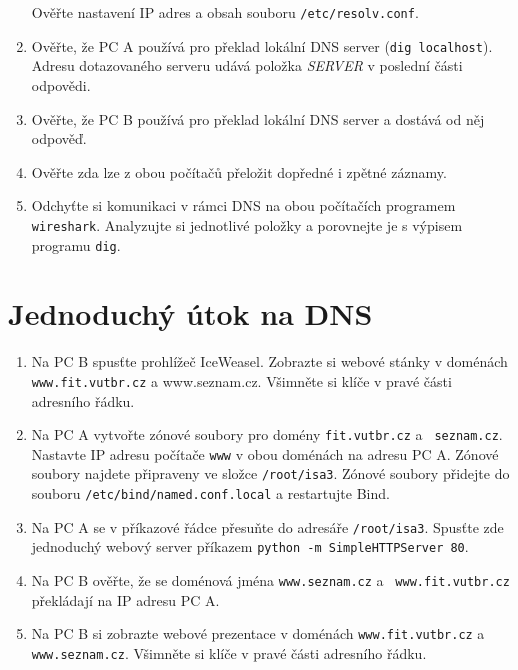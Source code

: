 \begin{enumerate}
    Ověřte nastavení IP adres a obsah souboru {\tt /etc/resolv.conf}.
  \item Ověřte, že PC A používá pro překlad lokální DNS server ({\tt dig
    localhost}). Adresu dotazovaného serveru udává položka {\em SERVER} v
    poslední části odpovědi.
  \item Ověřte, že PC B používá pro překlad lokální DNS server a dostává od něj odpověď.
  \item Ověřte zda lze z obou počítačů přeložit dopředné i zpětné záznamy.
  \item Odchyťte si komunikaci v rámci DNS na obou počítačích programem
    {\tt wireshark}. Analyzujte si jednotlivé položky a porovnejte je s výpisem
    programu {\tt dig}.

\end{enumerate}

\section{Jednoduchý útok na DNS}

\begin{enumerate}
  \item Na PC B spusťte prohlížeč IceWeasel. Zobrazte si webové stánky v
    doménách {\tt www.fit.vutbr.cz} a {www.seznam.cz}. Všimněte si klíče v pravé
    části adresního řádku.

  \item Na PC A vytvořte zónové soubory pro domény {\tt fit.vutbr.cz} a {\tt
    seznam.cz}. Nastavte IP adresu počítače {\tt www} v obou doménách na adresu
    PC A. Zónové soubory najdete připraveny ve složce {\tt /root/isa3}. Zónové
    soubory přidejte do souboru {\tt /etc/bind/named.conf.local} a restartujte
    Bind.

  \item Na PC A se v příkazové řádce přesuňte do adresáře {\tt /root/isa3}.
    Spusťte zde jednoduchý webový server příkazem {\tt python -m
    SimpleHTTPServer 80}.

  \item Na PC B ověřte, že se doménová jména {\tt www.seznam.cz} a {\tt
    www.fit.vutbr.cz} překládají na IP adresu PC A.

  \item Na PC B si zobrazte webové prezentace v doménách {\tt www.fit.vutbr.cz}
    a {\tt www.seznam.cz}. Všimněte si klíče v pravé části adresního řádku.

\end{enumerate}

